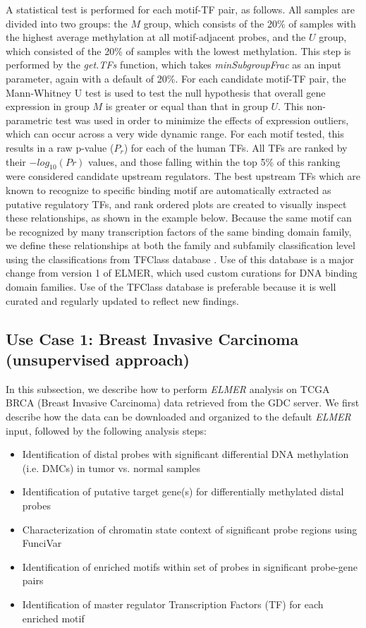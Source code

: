 A statistical test is performed for each motif-TF pair, as follows. All samples
are divided into two groups: the $M$ group, which consists
of the 20\% of samples with the highest average methylation at all motif-adjacent
probes, and the $U$ group, which consisted of the 20\%  of samples with the lowest
methylation. This step is performed by the \textit{get.TFs} function,
which takes \textit{minSubgroupFrac} as an input parameter, again with a default of 20\%.
For each candidate motif-TF pair, the Mann-Whitney U test is used to test
the null hypothesis that overall gene expression in group $M$ is greater or equal
than that in group $U$. This non-parametric test was used in order to minimize the
effects of expression outliers, which can occur across a very wide dynamic range.
For each motif tested, this results in a raw p-value ($P_r$) for each of the human TFs.
All TFs are ranked by their $-log_{10}(Pr)$ values, and those falling within the top 5\% of
this ranking were considered candidate upstream regulators. The best upstream
TFs which are known to recognize to specific binding motif are automatically extracted as putative
regulatory TFs, and rank ordered plots are created to visually inspect these
relationships, as shown in the example below. Because the same motif can be
recognized by many transcription factors of the same binding domain family,
we define these relationships at both the family and subfamily classification level using the
classifications from TFClass database \cite{wingender2013tfclass}.
 Use of this database is a major change from version 1 of ELMER, which used
 custom curations for DNA binding domain families. Use of the TFClass database
 is preferable because it is well curated and regularly updated to reflect new findings.



\subsection{Use Case 1: Breast Invasive Carcinoma (unsupervised approach)} %

In this subsection, we describe how to perform \textit{ELMER} analysis on TCGA BRCA
(Breast Invasive Carcinoma) data retrieved from the GDC server.
We first describe how the data can be downloaded and organized to
the default \textit{ELMER} input, followed by the following analysis steps:
\begin{itemize}
	\item Identification of distal probes with significant differential DNA methylation (i.e. DMCs) in tumor vs. normal samples
	\item Identification of putative target gene(s) for differentially methylated distal probes
    \item Characterization of chromatin state context of significant probe regions using FunciVar
	\item Identification of enriched motifs within set of probes in significant probe-gene pairs
	\item Identification of master regulator Transcription Factors (TF) for each enriched motif
\end{itemize}

